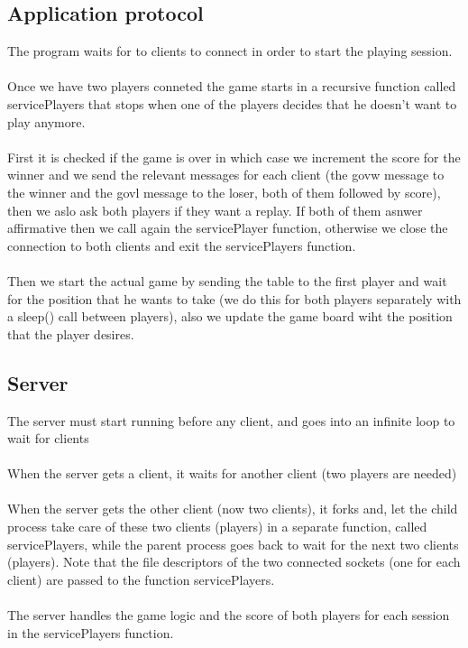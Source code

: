 \documentclass{article}
\begin{document}
\subsection{Application protocol}
The program waits for to clients to connect in order to start the playing session.\\\\
Once we have two players conneted the game starts in a recursive function called servicePlayers that stops when one of the players decides that he doesn't want to play anymore.\\\\
First it is checked if the game is over in which case we increment the score for the winner and we send the relevant messages for each client (the govw message to the winner and the govl message to the loser, both of them followed by score), then we aslo ask both players if they want a replay. If both of them asnwer affirmative then we call again the servicePlayer function, otherwise we close the connection to both clients and exit the servicePlayers function.\\\\
Then we start the actual game by sending the table to the first player and wait for the position that he wants to take (we do this for both players separately with a sleep() call between players), also we update the game board wiht the position that the player desires. 

\subsection{Server}
The server must start running before any client, and goes into an infinite loop to wait for clients\\ \\
When the server gets a client, it waits for another client (two players are needed)\\ \\
When the server gets the other client (now two clients), it forks and, let the child process take care of these two clients (players) in a separate function, called servicePlayers, while the parent process goes back to wait for the next two clients (players). Note that the file descriptors of the two connected sockets (one for each client) are passed to the function servicePlayers. \\ \\
The server handles the game logic and the score of both players for each session in the servicePlayers function.
\end{document}
